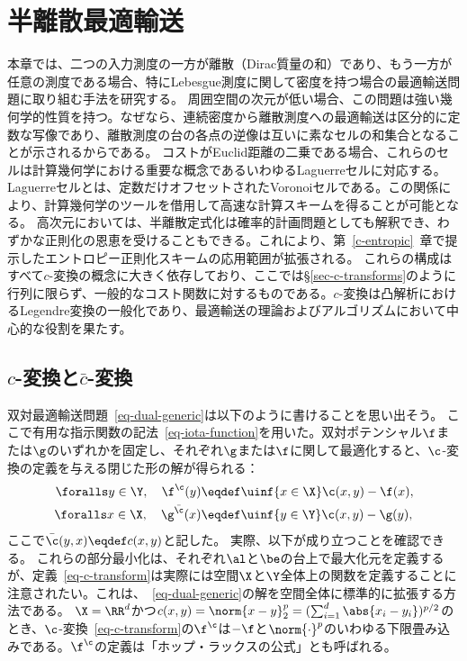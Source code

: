 
\chapter{半離散最適輸送}
\label{c-algo-semidiscr}

本章では、二つの入力測度の一方が離散（Dirac質量の和）であり、もう一方が任意の測度である場合、特にLebesgue測度に関して密度を持つ場合の最適輸送問題に取り組む手法を研究する。
%
周囲空間の次元が低い場合、この問題は強い幾何学的性質を持つ。なぜなら、連続密度から離散測度への最適輸送は区分的に定数な写像であり、離散測度の台の各点の逆像は互いに素なセルの和集合となることが示されるからである。
%
コストがEuclid距離の二乗である場合、これらのセルは計算幾何学における重要な概念であるいわゆるLaguerreセルに対応する。Laguerreセルとは、定数だけオフセットされたVoronoiセルである。この関係により、計算幾何学のツールを借用して高速な計算スキームを得ることが可能となる。
%
高次元においては、半離散定式化は確率的計画問題としても解釈でき、わずかな正則化の恩恵を受けることもできる。これにより、第~\ref{c-entropic}~章で提示したエントロピー正則化スキームの応用範囲が拡張される。
%
これらの構成はすべて$c$-変換の概念に大きく依存しており、ここでは\S\ref{sec-c-transforms}のように行列に限らず、一般的なコスト関数に対するものである。$c$-変換は凸解析におけるLegendre変換の一般化であり、最適輸送の理論およびアルゴリズムにおいて中心的な役割を果たす。

\section{$c$-変換と$\bar c$-変換}
\label{s-c-transform}

双対最適輸送問題~\eqref{eq-dual-generic}は以下のように書けることを思い出そう。
ここで有用な指示関数の記法~\eqref{eq-iota-function}を用いた。双対ポテンシャル$\f$または$\g$のいずれかを固定し、それぞれ$\g$または$\f$に関して最適化すると、$\c$-変換の定義を与える閉じた形の解が得られる：
\begin{align}\label{eq-c-transform}
	\foralls y \in \Y, \quad
	\f^\c(y) &\eqdef \uinf{x \in \X} \c(x,y) - \f(x), \\
	\foralls x \in \X, \quad
	\g^{\bar\c}(x) &\eqdef \uinf{y \in \Y} \c(x,y) - \g(y),
\end{align}
ここで$\bar\c(y,x) \eqdef c(x,y)$と記した。
%
実際、以下が成り立つことを確認できる。
これらの部分最小化は、それぞれ$\al$と$\be$の台上で最大化元を定義するが、定義~\eqref{eq-c-transform}は実際には空間$\X$と$\Y$全体上の関数を定義することに注意されたい。これは、~\eqref{eq-dual-generic}の解を空間全体に標準的に拡張する方法である。
%
$\X=\RR^d$かつ$c(x,y)=\norm{x-y}_2^p=(\sum_{i=1}^d \abs{x_i-y_i})^{p/2}$のとき、$\c$-変換~\eqref{eq-c-transform}の$\f^\c$は$-\f$と$\norm{\cdot}^p$のいわゆる下限畳み込みである。$\f^\c$の定義は「ホップ・ラックスの公式」とも呼ばれる。

